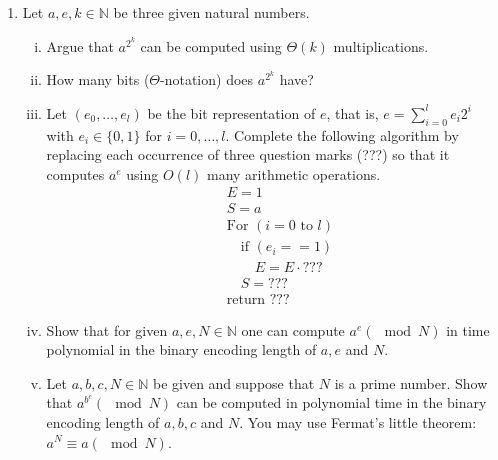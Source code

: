\documentclass[11pt]{article}
\newcommand{\setN}{\mathbb{N}}
\begin{document}
\begin{enumerate}[1)]
\item Let $a, e, k ∈ \setN$ be three given natural numbers.
\begin{enumerate}[i)]
\item Argue that $a^{2^k}$ can be computed using $Θ(k)$ multiplications.
\item How many bits ($Θ$-notation) does $a^{2^k}$ have?
\item Let $(e_0, \hdots, e_l)$ be the bit representation of $e$, that is, $e = \displaystyle\sum_{i= 0}^l e_i2^i$ with $e_i ∈ \{0, 1\}$ for $i= 0, \hdots, l$.
Complete the following algorithm by replacing each occurrence of three question marks (???) so
that it computes $a^e$ using $O(l)$ many arithmetic operations.
\begin{align*}
& E = 1\\
& S = a\\
&\text{For }(i=0 \text{ to }l) \\
& \quad \text{if  }(e_i == 1)\\
& \quad \quad E = E\cdot ??? \\
&\quad S = ??? \\
&\text{return }???
\end{align*}
\item Show that for given $a, e, N ∈ \setN$ one can compute $a^e (\mod N)$ in time polynomial in the binary
encoding length of $a, e$ and $N$.
\item Let $a, b, c, N ∈ \setN$ be given and suppose that $N$ is a prime number. Show that $a^{b^c} (\mod N)$ can
be computed in polynomial time in the binary encoding length of $a, b, c$ and $N$. You may use
Fermat’s little theorem: $a^N ≡ a (\mod N)$.
\end{enumerate}



\end{enumerate}
\end{document}
